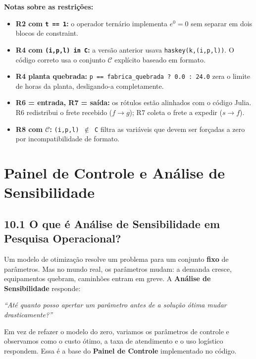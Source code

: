 \documentclass[12pt, a4paper]{article}
\begin{document}
\begin{mdframed}[style=destaque]
\textbf{\color{ballblue}Notas sobre as restri\c{c}\~{o}es:}
\begin{itemize}[leftmargin=1.5em, itemsep=3pt]
  \item \textbf{R2 com \texttt{t == 1}:} o operador tern\'{a}rio implementa $e^0 = 0$
    sem separar em dois blocos de constraint.
  \item \textbf{R4 com \texttt{(i,p,l) in C}:} a vers\~{a}o anterior usava
    \texttt{haskey(k,(i,p,l))}. O c\'{o}digo correto usa o conjunto $\mathcal{C}$
    expl\'{i}cito baseado em formato.
  \item \textbf{R4 planta quebrada:} \texttt{p == fabrica\_quebrada ? 0.0 : 24.0}
    zera o limite de horas da planta, desligando-a completamente.
  \item \textbf{R6 = entrada, R7 = sa\'{i}da:} os r\'{o}tulos est\~{a}o alinhados
    com o c\'{o}digo Julia. R6 redistribui o frete recebido ($f \to g$);
    R7 coleta o frete a expedir ($s \to f$).
  \item \textbf{R8 com $\mathcal{C}$:} \texttt{(i,p,l) \ensuremath{\notin} C}
    filtra as vari\'{a}veis que devem ser for\c{c}adas a zero por incompatibilidade de formato.
\end{itemize}
\end{mdframed}

\newpage
\section{Painel de Controle e An\'{a}lise de Sensibilidade}

\subsection*{10.1 O que \'{e} An\'{a}lise de Sensibilidade em Pesquisa Operacional?}

\begin{mdframed}[style=destaque]
Um modelo de otimiza\c{c}\~{a}o resolve um problema para um conjunto \textbf{fixo} de par\^{a}metros.
Mas no mundo real, os par\^{a}metros mudam: a demanda cresce, equipamentos quebram,
caminhões entram em greve. A \textbf{An\'{a}lise de Sensibilidade} responde:

\begin{center}
  \textit{``At\'{e} quanto posso apertar um par\^{a}metro antes de a solu\c{c}\~{a}o \'{o}tima mudar drasticamente?''}
\end{center}

Em vez de refazer o modelo do zero, variamos os par\^{a}metros de controle e observamos
como o custo \'{o}timo, a taxa de atendimento e o uso log\'{i}stico respondem.
Essa \'{e} a base do \textbf{Painel de Controle} implementado no c\'{o}digo.
\end{mdframed}
\end{document}
